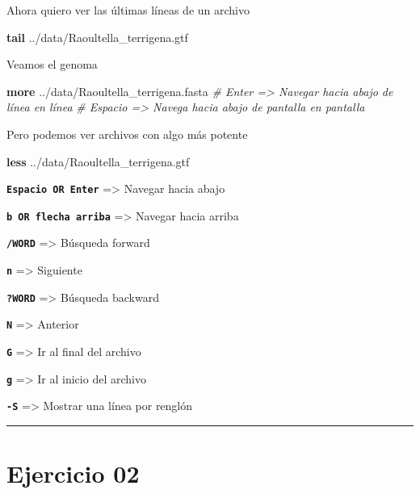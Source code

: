 \documentclass[
]{book}
\newenvironment{Shaded}{\begin{snugshade}}{\end{snugshade}}
\newcommand{\CommentTok}[1]{\textcolor[rgb]{0.56,0.35,0.01}{\textit{#1}}}
\newcommand{\FunctionTok}[1]{\textcolor[rgb]{0.13,0.29,0.53}{\textbf{#1}}}
\newcommand{\NormalTok}[1]{#1}
\begin{document}
Ahora quiero ver las últimas líneas de un archivo

\begin{Shaded}
\begin{Highlighting}[]
\FunctionTok{tail}\NormalTok{ ../data/Raoultella\_terrigena.gtf}
\end{Highlighting}
\end{Shaded}

Veamos el genoma

\begin{Shaded}
\begin{Highlighting}[]
\FunctionTok{more}\NormalTok{ ../data/Raoultella\_terrigena.fasta}
\CommentTok{\# Enter =\textgreater{} Navegar hacia abajo de línea en línea}
\CommentTok{\# Espacio =\textgreater{} Navega hacia abajo de pantalla en pantalla}
\end{Highlighting}
\end{Shaded}

Pero podemos ver archivos con algo más potente

\begin{Shaded}
\begin{Highlighting}[]
\FunctionTok{less}\NormalTok{ ../data/Raoultella\_terrigena.gtf}
\end{Highlighting}
\end{Shaded}

\textbf{\texttt{Espacio\ OR\ Enter}} =\textgreater{} Navegar hacia abajo

\textbf{\texttt{b\ OR\ flecha\ arriba}} =\textgreater{} Navegar hacia arriba

\textbf{\texttt{/WORD}} =\textgreater{} Búsqueda forward

\textbf{\texttt{n}} =\textgreater{} Siguiente

\textbf{\texttt{?WORD}} =\textgreater{} Búsqueda backward

\textbf{\texttt{N}} =\textgreater{} Anterior

\textbf{\texttt{G}} =\textgreater{} Ir al final del archivo

\textbf{\texttt{g}} =\textgreater{} Ir al inicio del archivo

\textbf{\texttt{-S}} =\textgreater{} Mostrar una línea por renglón

\begin{center}\rule{0.5\linewidth}{0.5pt}\end{center}

\section{Ejercicio 02}\label{ejercicio-02}
\end{document}
